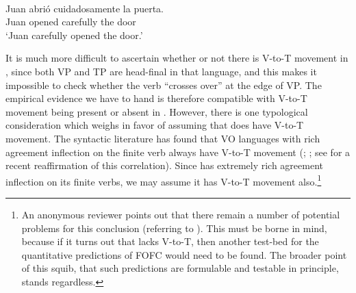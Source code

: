 \documentclass[output=paper]{langsci/langscibook}
\begin{document}
\ea {}\\
    \gll    Juan abrió     cuidadosamente la    puerta.\\
            Juan opened  carefully             the door\\
    \glt    \enquote*{Juan carefully opened the door.}\\[-.5em]
\z

It is much more difficult to ascertain whether or not there is V-to-T movement
in , since both VP and TP are head-final in that language, and this
makes it impossible to check whether the verb “crosses over”  at the
edge of VP.  The empirical evidence we have to hand is therefore compatible
with V-to-T movement being present or absent in .  However, there is one
typological consideration which weighs in favor of assuming that  does
have V-to-T movement.  The syntactic literature has found that VO languages
with rich agreement inflection on the finite verb always have V-to-T movement
(\citealt{Kosmeijer1986}; \citealt{Pollock1989}; see \citealt{KoeZei2012} for a
recent reaffirmation of this correlation).  Since  has extremely rich
agreement inflection on its finite verbs, we may assume it has V-to-T movement
also.\footnote{An anonymous reviewer points out that there remain a number of
    potential problems for this conclusion (referring to \citealt{Vikner2005,%
    HanLidzMus2007,HanMusLidz2016}).  This must be borne in mind, because if it
    turns out that  lacks V-to-T, then another test-bed for the
quantitative predictions of \gls{FOFC} would need to be found.  The broader
point of this squib, that such predictions are formulable and testable in
principle, stands regardless.}
\end{document}
